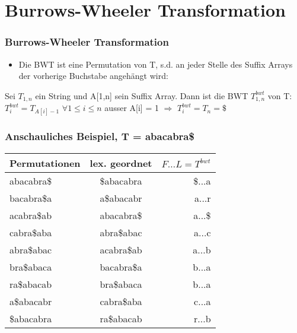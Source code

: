 \documentclass{beamer}
\begin{document}
\section{Burrows-Wheeler Transformation}
\begin{frame}
\frametitle{Burrows-Wheeler Transformation}
\begin{itemize}
\item Die BWT ist eine Permutation von T, s.d. an jeder Stelle des Suffix Arrays der vorherige Buchstabe angehängt wird:
\end{itemize}
\begin{Definition}
Sei $T_{1,n}$ ein String und A[1,n] sein Suffix Array. Dann ist die BWT $T_{1,n}^{bwt}$ von T: \newline $T_{i}^{bwt} = T_{A[i]-1}$ $\forall 1 \leq i \leq n$ ausser A[i] = 1 $\Rightarrow$ $T_{i}^{bwt} = T_n = \$ $
\end{Definition}
\end{frame}
\begin{frame}
\frametitle{Anschauliches Beispiel, T = \glqq abacabra\$\grqq}
\begin{tabular}{l<{\ttfamily} c<{\ttfamily} r<{\ttfamily}}
\textbf{Permutationen} & \textbf{lex. geordnet} & $F\ldots L = T^{bwt}$ \\\hline
abacabra\$ & \$abacabra & \$...a \\
bacabra\$a & a\$abacabr & a...r \\
acabra\$ab & abacabra\$ & a...\$ \\
cabra\$aba & abra\$abac & a...c \\
abra\$abac & acabra\$ab & a...b \\
bra\$abaca & bacabra\$a & b...a \\
ra\$abacab & bra\$abaca & b...a \\
a\$abacabr & cabra\$aba & c...a \\
\$abacabra & ra\$abacab & r...b \\
\end{tabular}\\[5mm]
\end{frame}
\end{document}
